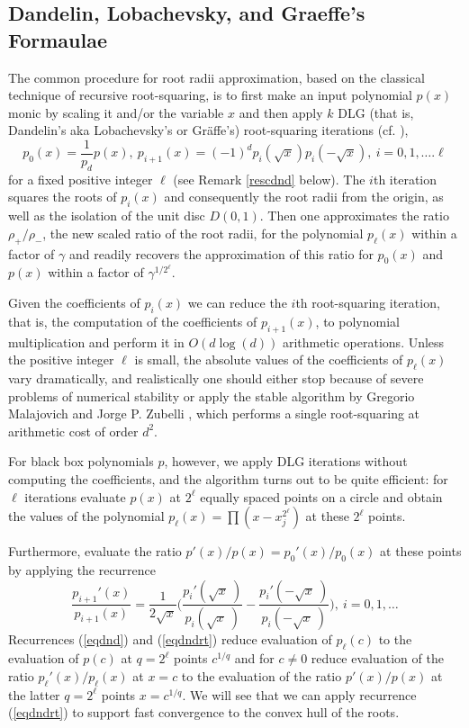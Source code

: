 \documentclass[sigconf]{acmart}
\begin{document}
\subsection{Dandelin, Lobachevsky, and Graeffe's Formaulae}\label{subsec:DLG_form}
 The common procedure for root radii  approximation, based on the classical technique of recursive root-squaring, is to first make an input polynomial $p(x)$ monic by scaling it and/or the variable
  $x$ and then
 apply $k$ DLG (that is, Dandelin's aka
Lobachevsky's or Gr{\"a}ffe's) root-squaring iterations
(cf. \cite{10.2307/2310626}),
\begin{equation}\label{eqdnd}
 p_0(x)=\frac{1}{p_d}p(x),~p_{i+1}(x)=(-1)^ dp_i(\sqrt x)
p_i(-\sqrt x),~i=0,1,\dots.\ell
\end{equation}
for a fixed positive integer $\ell$
(see Remark \ref{rescdnd} below).
The $i$th  iteration squares the roots of $p_i(x)$ and
consequently the root radii from the origin, as well as
the  isolation of the unit disc $D(0,1)$.
Then one approximates
the ratio  $\rho_+/\rho_-$, the new scaled ratio of the root radii, for the polynomial $p_{\ell}(x)$ within a factor of $\gamma$ and readily recovers the approximation of this ratio for $p_0(x)$ and
$p(x)$ within a factor of
$\gamma^{1/2^{\ell}}$.

Given the coefficients of
$p_i(x)$
we can reduce the $i$th root-squaring iteration, that is, the computation of
the coefficients of  $p_{i+1}(x)$, to polynomial multiplication and perform it in $O(d\log(d))$ arithmetic operations.
Unless the positive integer $\ell$ is small, the absolute values of the coefficients
of $p_{\ell}(x)$ vary  dramatically, and realistically one should either stop because of severe problems of numerical stability or apply the stable algorithm by Gregorio Malajovich and Jorge  P. Zubelli \cite{Malajovich2001OnTG}, which performs a single root-squaring at  arithmetic cost of order $d^2$.

For black box polynomials $p$, however, we apply
DLG iterations without computing
the coefficients, and the algorithm turns out to be quite efficient:
 for $\ell$ iterations  evaluate
 $p(x)$ at  $2^{\ell}$ equally spaced points  on a circle and obtain
 the values of the polynomial $p_{\ell}(x)=\prod\left(x-x_j^{2^{\ell}}\right)$
 at these $2^{\ell}$ points.

Furthermore,  evaluate the ratio
$p'(x)/p(x)=p_0'(x)/p_0(x)$
at these points by applying
the recurrence
 \begin{equation}\label{eqdndrt} \frac{p_{i+1}'(x)}{p_{i+1}(x)}=\frac{1}{2\sqrt x}\Big(\frac{p_{i}'(\sqrt x~)}{p_{i}(\sqrt x~)}-\frac{p_{i}'(-\sqrt x~)}{p_{i}(-\sqrt x~)}\Big),~i=0,1,\dots
\end{equation}
Recurrences (\ref{eqdnd}) and (\ref{eqdndrt}) reduce evaluation  of  $p_{\ell}(c)$ to the evaluation of $p(c)$ at  $q=2^{\ell}$  points
$c^{1/q}$ and  for $c\neq 0$ reduce evaluation  of
 the ratio
$p_{\ell}'(x)/p_{\ell}(x)$ at $x=c$ to the evaluation
of the ratio
$p'(x)/p(x)$ at the latter $q=2^{\ell}$ points $x=c^{1/q}$.
We will see that we can apply  recurrence (\ref{eqdndrt})
to support fast convergence to the convex hull of the roots.
\end{document}
